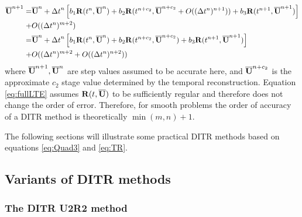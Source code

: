 \begin{equation}
    \begin{aligned}
        \overline{\mathbf{U}}^{n+1} = & \overline{\mathbf{U}}^{n} + {\mathrm\Delta t}^{n}
        \left[
            b_1\mathbf{R}(t^n, \overline{\mathbf{U}}^n)
            +
            b_2\mathbf{R}(t^{n+c_2}, \overline{\mathbf{U}}^{n+c_2} + O((\mathrm\Delta t^{n})^{n+1} ))
            +
            b_3\mathbf{R}(t^{n+1}, \overline{\mathbf{U}}^{n+1})
            \right]
        \\ + &
        O((\mathrm\Delta t^{n})^{m+2} )               \\
        =           &
        \overline{\mathbf{U}}^{n} + {\mathrm\Delta t}^{n}
        \left[
            b_1\mathbf{R}(t^n, \overline{\mathbf{U}}^n)
            +
            b_2\mathbf{R}(t^{n+c_2}, \overline{\mathbf{U}}^{n+c_2})
            +
            b_3\mathbf{R}(t^{n+1}, \overline{\mathbf{U}}^{n+1})
            \right]
        \\ + &
        O((\mathrm\Delta t^{n})^{m+2}  + O((\mathrm\Delta t^{n})^{n+2} ))
    \end{aligned}
    \label{eq:fullLTE}
\end{equation}
where $\overline{\mathbf{U}}^{n+1}, \overline{\mathbf{U}}^{n}$ are step values assumed to be accurate here, and
$\overline{\mathbf{U}}^{n+c_2}$ is the approximate
$c_2$ stage value determined by the temporal reconstruction.
Equation \eqref{eq:fullLTE} assumes
$\mathbf{R}(t, \overline{\mathbf{U}})$ to be sufficiently regular and therefore does not
change the order of error.
Therefore, for smooth problems the
order of accuracy of a DITR
method is theoretically $\min(m,n) + 1$.

The following sections will illustrate some
practical DITR methods based on equations \eqref{eq:Quad3} and \eqref{eq:TR}.


\subsection{Variants of DITR methods}



\subsubsection{The DITR U2R2 method}

